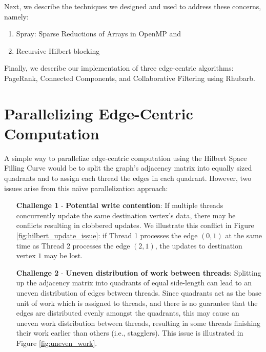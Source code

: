 Next, we describe the techniques we designed and used to address these concerns, namely:
\begin{enumerate}
    \item Spray: Sparse Reductions of Arrays in OpenMP \cite{spray} and 
    \item Recursive Hilbert blocking 
    
\end{enumerate}

Finally, we describe our implementation of three edge-centric algorithms: PageRank, Connected Components, and Collaborative Filtering using Rhubarb.



\section{Parallelizing Edge-Centric Computation}
A simple way to parallelize edge-centric computation using the Hilbert Space Filling Curve would be to split the graph's adjacency matrix into equally sized quadrants and to assign each thread the edges in each quadrant. However, two issues arise from this na\"{\i}ve  parallelization approach:


\begin{itemize}
    \item [\textbf{Challenge 1}] - \textbf{Potential write contention}: 
    If multiple threads concurrently update the same destination vertex's data, there 
    may be conflicts resulting in clobbered updates. We illustrate this conflict in Figure \ref{fig:hilbert_update_issue}: if Thread 1 processes the edge $(0, 1)$ at the same time as Thread 2 processes the edge $(2, 1)$, the updates to destination vertex $1$ may be lost.
    \item [\textbf{Challenge 2}] - \textbf{Uneven distribution of work between threads}: Splitting up the
    adjacency matrix into quadrants of equal side-length can lead to an uneven 
    distribution of edges between threads. Since quadrants act as the base unit of work which is assigned to threads, and there is no guarantee that the edges are distributed evenly amongst the quadrants, this may cause an uneven work distribution between threads, resulting in some threads finishing their work earlier than others (i.e., stagglers). This issue is illustrated in Figure 
    \ref{fig:uneven_work}.
\end{itemize}

